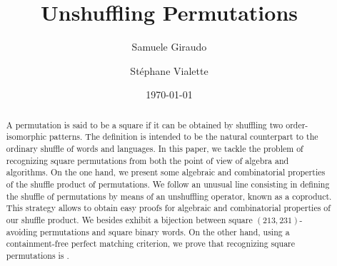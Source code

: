 \documentclass[a4paper]{llncs}
\begin{document}

\title{%
Unshuffling Permutations}%

\author{%
  Samuele Giraudo \and
  St\'ephane Vialette
}%
\date{\today}

\maketitle


\begin{abstract}
    A permutation is said to be a square if it can be obtained by
    shuffling two order-isomorphic patterns. The definition is intended
    to be the natural counterpart to the ordinary shuffle of words and
    languages. In this paper, we tackle the problem of recognizing square
    permutations from both the point of view of algebra and algorithms.
    On the one hand, we present some algebraic and combinatorial
    properties of the shuffle product of permutations. We follow an
    unusual line consisting in defining the shuffle of permutations by
    means of an unshuffling operator, known as a coproduct. This
    strategy allows to obtain easy proofs for algebraic and combinatorial
    properties of our shuffle product. We besides exhibit a bijection
    between square $(213,231)$-avoiding permutations and square binary
    words. On the other hand, using a containment-free perfect matching 
    criterion, we prove that recognizing square permutations is \NPC.
\end{abstract}


\end{document}
